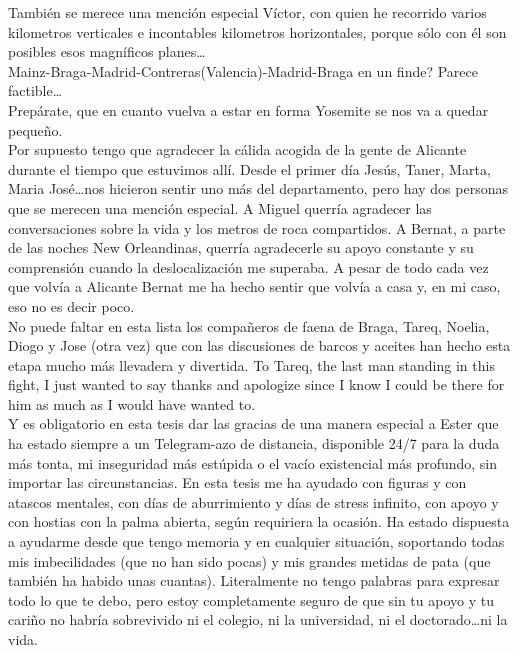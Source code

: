 También se merece una mención especial Víctor, con quien he recorrido varios kilometros verticales e incontables kilometros horizontales, porque sólo con él son posibles esos magníficos planes\dots\\
Mainz-Braga-Madrid-Contreras(Valencia)-Madrid-Braga en un finde? Parece factible\dots\\
Prepárate, que en cuanto vuelva a estar en forma Yosemite se nos va a quedar pequeño.\\


Por supuesto tengo que agradecer la cálida acogida de la gente de Alicante durante el tiempo que estuvimos allí. Desde el primer día Jesús, Taner, Marta, Maria José\dots nos hicieron sentir uno más del departamento, pero hay dos personas que se merecen una mención especial. A Miguel querría agradecer las conversaciones sobre la vida y los metros de roca compartidos. A Bernat, a parte de las noches New Orleandinas, querría agradecerle su apoyo constante y su comprensión cuando la deslocalización me superaba. A pesar de todo cada vez que volvía a Alicante Bernat me ha hecho sentir que volvía a casa y, en mi caso, eso no es decir poco.\\

No puede faltar en esta lista los compañeros de faena de Braga, Tareq, Noelia, Diogo y Jose (otra vez) que con las discusiones de barcos y aceites han hecho esta etapa mucho más llevadera y divertida. To Tareq, the last man standing in this fight, I just wanted to say thanks and apologize since I know I could be there for him as much as I would have wanted to.\\


Y es obligatorio en esta tesis dar las gracias de una manera especial a Ester que ha estado siempre a un Telegram-azo de distancia, disponible 24/7 para la duda más tonta, mi inseguridad más estúpida o el vacío existencial más profundo, sin importar las circunstancias. En esta tesis me ha ayudado con figuras y con atascos mentales, con días de aburrimiento y días de stress infinito, con apoyo y con hostias con la palma abierta, según requiriera la ocasión.
Ha estado dispuesta a ayudarme desde que tengo memoria y en cualquier situación, soportando todas mis imbecilidades (que no han sido pocas) y mis grandes metidas de pata (que también ha habido unas cuantas).
Literalmente no tengo palabras para expresar todo lo que te debo, pero estoy completamente seguro de que sin tu apoyo y tu cariño no habría sobrevivido ni el colegio, ni la universidad, ni el doctorado\dots ni la vida.\\


